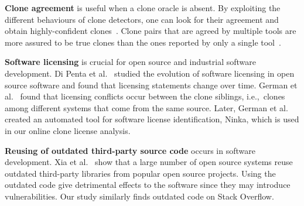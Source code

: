 \documentclass[10pt,journal,compsoc]{IEEEtran}
\begin{document}
\textbf{Clone agreement} is useful when a clone oracle is
absent. %
By exploiting the different behaviours of clone detectors,
one can look for their agreement and obtain
highly-confident clones~\cite{Bellon2007,Wang2013}. %
Clone pairs that are agreed by multiple tools are more assured to be true
clones than the ones reported by only a single
tool~\cite{Wang2013,cr2016ssbse,Funaro2010}. 

\textbf{Software licensing} is crucial for open source and 
industrial software development. Di Penta et al.~\cite{DiPenta2010}
studied the evolution of software licensing in open source 
software and found that licensing statements change over 
time. German et al.~\cite{German2009} found that licensing 
conflicts occur between the clone siblings, i.e.,~clones among 
different systems that come from the same source. Later, 
German et al.~\cite{German2010} created an automated tool 
for software license identification, Ninka, which is used
in our online clone license analysis. 

\textbf{Reusing of outdated third-party source code} occurs 
in software development. Xia et al.~\cite{Xia2014} show that 
a large number of open source systems reuse outdated third-party 
libraries from popular open source projects. Using the outdated 
code give detrimental effects to the software since they may 
introduce vulnerabilities. Our study similarly finds
outdated code on Stack Overflow.
\end{document}

